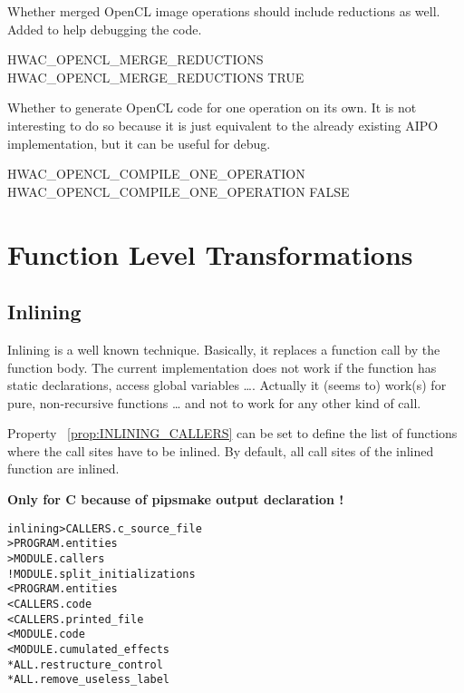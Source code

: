 \documentclass[a4paper]{report}
\newenvironment{PipsMake}{\begin{alltt}}{\end{alltt}}
\newcommand{\PipsPropRef}[1]{\texttt{\detokenize{#1}}~\ref{prop:#1}}
\newenvironment{PipsPass}[1]{\label{pass:#1}}{}
\begin{document}
Whether merged OpenCL image operations should include reductions as well.
Added to help debugging the code.
\begin{PipsProp}{HWAC_OPENCL_MERGE_REDUCTIONS}
HWAC_OPENCL_MERGE_REDUCTIONS TRUE
\end{PipsProp}

Whether to generate OpenCL code for one operation on its own.
It is not interesting to do so because it is just equivalent to
the already existing AIPO implementation, but it can be useful for
debug.
\begin{PipsProp}{HWAC_OPENCL_COMPILE_ONE_OPERATION}
HWAC_OPENCL_COMPILE_ONE_OPERATION FALSE
\end{PipsProp}


\section{Function Level Transformations}



\subsection{Inlining}
\label{subsection-inlining}

\begin{PipsPass}{inlining}
Inlining is a well known technique.  Basically, it replaces a function
call by the function body. The current implementation does not work if
the function has static declarations, access global variables \dots.
Actually it (seems to) work(s) for pure, non-recursive functions \dots
and not to work for any other kind of call.

Property \PipsPropRef{INLINING_CALLERS} can be set to define the list of
functions where the call sites have to be inlined. By default, all
call sites of the inlined function are inlined.
\end{PipsPass}

\textbf{Only for C because of pipsmake output declaration !}
\begin{PipsMake}
inlining      > CALLERS.c_source_file
              > PROGRAM.entities
              > MODULE.callers
		! MODULE.split_initializations
        < PROGRAM.entities
        < CALLERS.code
        < CALLERS.printed_file
		< MODULE.code
        < MODULE.cumulated_effects
        * ALL.restructure_control
		* ALL.remove_useless_label
\end{PipsMake}
\end{document}
